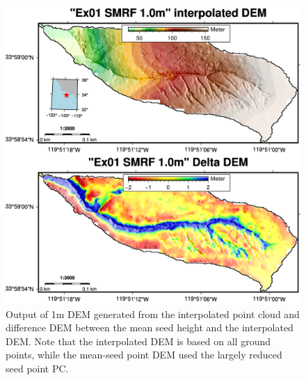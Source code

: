 \documentclass[a4paperpaper,,tablecaptionabove]{scrartcl}
\begin{document}
\begin{figure}
\centering
\includegraphics[width=\textwidth,height=0.9\textheight]{./tex2pdf.-e6884bf2dada0f3b/d939b9bb2bf4c38cf01849d92eb998542f7c8258.png}
\caption{Output of 1m DEM generated from the interpolated point cloud
and difference DEM between the mean seed height and the interpolated
DEM. Note that the interpolated DEM is based on all ground points, while
the mean-seed point DEM used the largely reduced seed point
PC.\label{Fig:Ex01_cl2_1.0m_2panel_DEMs}}
\end{figure}
\end{document}
